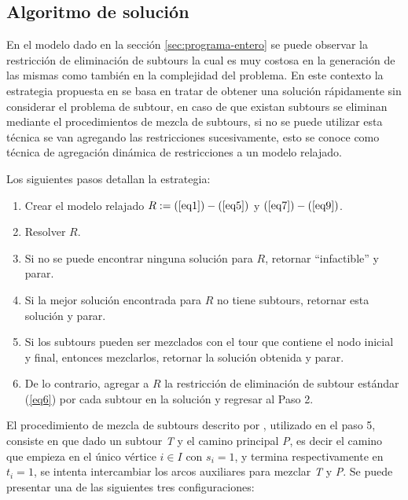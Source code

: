 \subsection{Algoritmo de solución}
\label{algoritmo-solucion}

En el modelo dado en la sección \ref{sec:programa-entero} se puede observar la restricción de eliminación de subtours la cual es muy costosa en la generación de las mismas como también en la complejidad del problema. En este contexto la estrategia propuesta en \citet{Braier2017AnArgentina} se basa en tratar de obtener una solución rápidamente sin considerar el problema de subtour, en caso de que existan subtours se eliminan mediante el procedimientos de mezcla de subtours, si no se puede utilizar esta técnica se van agregando las restricciones sucesivamente, esto se conoce como técnica de agregación dinámica de restricciones a un modelo relajado.

Los siguientes pasos detallan la estrategia:

\begin{enumerate}
\item Crear el modelo relajado $R: = (\ref{eq1}) - (\ref{eq5})$ y $(\ref{eq7}) - (\ref{eq9})$.
\item Resolver $R$.
\item Si no se puede encontrar ninguna solución para $R$, retornar ``infactible'' y parar.
\item Si la mejor solución encontrada para $R$ no tiene subtours, retornar esta solución y parar.
\item Si los subtours pueden ser mezclados con el tour que contiene el nodo inicial y final, entonces mezclarlos, retornar la solución obtenida y parar.
\item De lo contrario, agregar a $R$ la restricción de eliminación de subtour estándar (\ref{eq6}) por cada subtour en la solución y regresar al Paso 2.
\end{enumerate}

El procedimiento de mezcla de subtours descrito por \citet{Braier2017AnArgentina}, utilizado en el paso 5, consiste en que dado un subtour \textit{T} y el camino principal \textit{P}, es decir el camino que empieza en el único vértice $i \in I$ con $s_i = 1$, y termina respectivamente en $t_i = 1$, se intenta intercambiar los arcos auxiliares para mezclar \textit{T} y \textit{P}. Se puede presentar una de las siguientes tres configuraciones:

